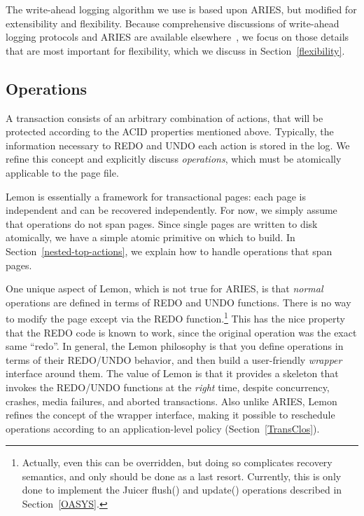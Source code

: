 \documentclass[10pt,letterpaper,twocolumn,english]{article}
\newcommand{\yad}{Lemon\xspace}
\newcommand{\oasys}{Juicer\xspace}
\begin{document}
The write-ahead logging algorithm we use is based upon ARIES, but
modified for extensibility and flexibility. Because comprehensive
discussions of write-ahead logging protocols and ARIES are available
elsewhere~\cite{haerder, aries}, we focus on those details that are
most important for flexibility, which we discuss in Section~\ref{flexibility}.


\subsection{Operations}
\label{sub:OperationProperties}

A transaction consists of an arbitrary combination of actions, that
will be protected according to the ACID properties mentioned above.
Typically, the
information necessary to REDO and UNDO each action is stored in the
log.  We refine this concept and explicitly discuss {\em operations},
which must be atomically applicable to the page file.  

\yad is essentially a framework for transactional pages: each page is
independent and can be recovered independently. For now, we simply
assume that operations do not span pages.  Since single pages are
written to disk atomically, we have a simple atomic primitive on which
to build. In Section~\ref{nested-top-actions}, we explain how to
handle operations that span pages.

One unique aspect of \yad, which is not true for ARIES, is that {\em
normal} operations are defined in terms of REDO and UNDO
functions. There is no way to modify the page except via the REDO
function.\footnote{Actually, even this can be overridden, but doing so
complicates recovery semantics, and only should be done as a last
resort.  Currently, this is only done to implement the \oasys flush()
and update() operations described in Section~\ref{OASYS}.}  This has
the nice property that the REDO code is known to work, since the
original operation was the exact same ``redo''.  In general, the \yad
philosophy is that you define operations in terms of their REDO/UNDO
behavior, and then build a user-friendly {\em wrapper} interface
around them.  The value of \yad is that it provides a skeleton that
invokes the REDO/UNDO functions at the {\em right} time, despite
concurrency, crashes, media failures, and aborted transactions.  Also
unlike ARIES, \yad refines the concept of the wrapper interface,
making it possible to reschedule operations according to an
application-level policy (Section~\ref{TransClos}).
\end{document}
